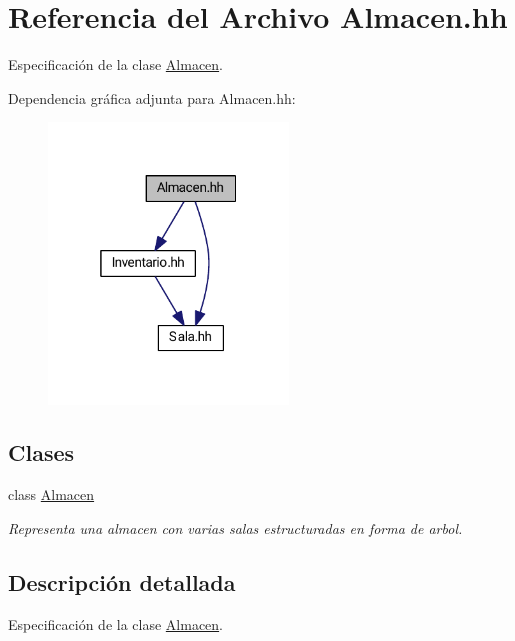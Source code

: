 \hypertarget{_almacen_8hh}{}\section{Referencia del Archivo Almacen.\+hh}
\label{_almacen_8hh}


Especificación de la clase \hyperlink{class_almacen}{Almacen}.  


Dependencia gráfica adjunta para Almacen.\+hh\+:
\nopagebreak
\begin{figure}[H]
\begin{center}
\leavevmode
\includegraphics[width=181pt]{_almacen_8hh__incl}
\end{center}
\end{figure}
\subsection*{Clases}
\begin{DoxyCompactItemize}
\item 
class \hyperlink{class_almacen}{Almacen}
\begin{DoxyCompactList}\small\item\em Representa una almacen con varias salas estructuradas en forma de arbol. \end{DoxyCompactList}\end{DoxyCompactItemize}


\subsection{Descripción detallada}
Especificación de la clase \hyperlink{class_almacen}{Almacen}. 

